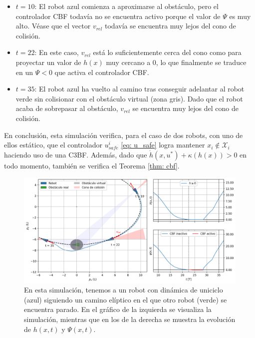 \begin{itemize}
    \item $t = 10$: El robot azul comienza a aproximarse al obstáculo, pero el controlador CBF todavía no se encuentra activo porque el valor de $\Psi$ es muy alto. Véase que el vector $v_{rel}$ todavía se encuentra muy lejos del cono de colisión.\\
    
    \item $t = 22$: En este caso, $v_{rel}$ está lo suficientemente cerca del cono como para proyectar un valor de $h(x)$ muy cercano a 0, lo que finalmente se traduce en un $\Psi < 0$ que activa el controlador CBF.\\
    
    \item $t = 35$: El robot azul ha vuelto al camino tras conseguir adelantar al robot verde sin colisionar con el obstáculo virtual (zona gris). Dado que el robot acaba de sobrepasar al obstáculo, $v_{rel}$ se encuentra muy lejos del cono de colisión.\\
    
\end{itemize}

\newpage

En conclusión, esta simulación verifica, para el caso de dos robots, con uno de ellos estático, que el controlador $u_{safe}^i$ \eqref{eq: u_safe} logra mantener $x_i \notin \mathcal{X}_i$ haciendo uso de una C3BF. Además, dado que $\dot h(x,u^*) + \kappa(h(x)) > 0$ en todo momento, también se verifica el Teorema \ref{thm: cbf}.

\begin{figure}[h!]
    \centering
    \includegraphics[trim={0 0cm 0 -1cm}, clip, width=1\textwidth]{fig/sim_static.png}
    \caption{En esta simulación, tenemos a un robot con dinámica de uniciclo (azul) siguiendo un camino elíptico en el que otro robot (verde) se encuentra parado. En el gráfico de la izquierda se visualiza la simulación, mientras que en los de la derecha se muestra la evolución de $h(x,t)$ y $\Psi(x,t)$.}
    \label{fig: sim_static}
\end{figure}

